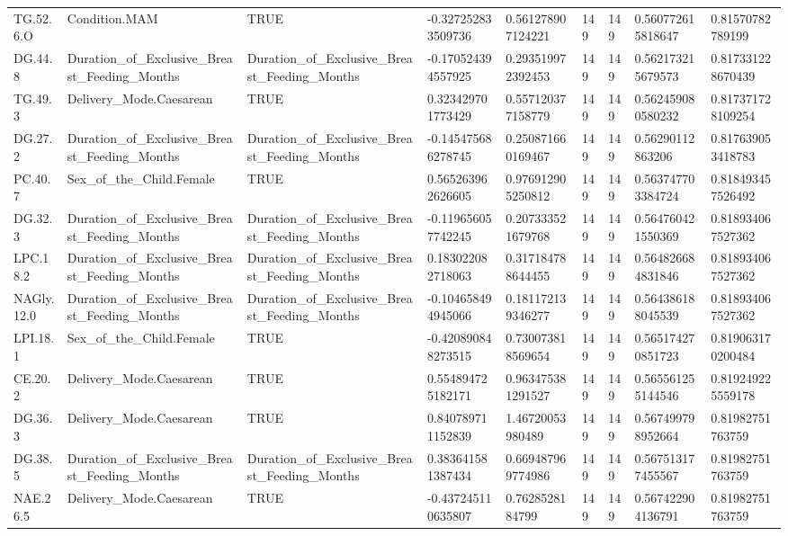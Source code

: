 \begin{longtable}{lllllllll}
TG.52.6.O & Condition.MAM & TRUE & -0.327252833509736 & 0.561278907124221 & 149 & 149 & 0.560772615818647 & 0.81570782789199 \\
DG.44.8 & Duration\_of\_Exclusive\_Breast\_Feeding\_Months & Duration\_of\_Exclusive\_Breast\_Feeding\_Months & -0.170524394557925 & 0.293519972392453 & 149 & 149 & 0.562173215679573 & 0.817331228670439 \\
TG.49.3 & Delivery\_Mode.Caesarean & TRUE & 0.323429701773429 & 0.557120377158779 & 149 & 149 & 0.562459080580232 & 0.817371728109254 \\
DG.27.2 & Duration\_of\_Exclusive\_Breast\_Feeding\_Months & Duration\_of\_Exclusive\_Breast\_Feeding\_Months & -0.145475686278745 & 0.250871660169467 & 149 & 149 & 0.56290112863206 & 0.817639053418783 \\
PC.40.7 & Sex\_of\_the\_Child.Female & TRUE & 0.565263962626605 & 0.976912905250812 & 149 & 149 & 0.563747703384724 & 0.818493457526492 \\
DG.32.3 & Duration\_of\_Exclusive\_Breast\_Feeding\_Months & Duration\_of\_Exclusive\_Breast\_Feeding\_Months & -0.119656057742245 & 0.207333521679768 & 149 & 149 & 0.564760421550369 & 0.818934067527362 \\
LPC.18.2 & Duration\_of\_Exclusive\_Breast\_Feeding\_Months & Duration\_of\_Exclusive\_Breast\_Feeding\_Months & 0.183022082718063 & 0.317184788644455 & 149 & 149 & 0.564826684831846 & 0.818934067527362 \\
NAGly.12.0 & Duration\_of\_Exclusive\_Breast\_Feeding\_Months & Duration\_of\_Exclusive\_Breast\_Feeding\_Months & -0.104658494945066 & 0.181172139346277 & 149 & 149 & 0.564386188045539 & 0.818934067527362 \\
LPI.18.1 & Sex\_of\_the\_Child.Female & TRUE & -0.420890848273515 & 0.730073818569654 & 149 & 149 & 0.565174270851723 & 0.819063170200484 \\
CE.20.2 & Delivery\_Mode.Caesarean & TRUE & 0.554894725182171 & 0.963475381291527 & 149 & 149 & 0.565561255144546 & 0.819249225559178 \\
DG.36.3 & Delivery\_Mode.Caesarean & TRUE & 0.840789711152839 & 1.46720053980489 & 149 & 149 & 0.567499798952664 & 0.81982751763759 \\
DG.38.5 & Duration\_of\_Exclusive\_Breast\_Feeding\_Months & Duration\_of\_Exclusive\_Breast\_Feeding\_Months & 0.383641581387434 & 0.669487969774986 & 149 & 149 & 0.567513177455567 & 0.81982751763759 \\
NAE.26.5 & Delivery\_Mode.Caesarean & TRUE & -0.437245110635807 & 0.7628528184799 & 149 & 149 & 0.567422904136791 & 0.81982751763759 \\

\end{longtable}
